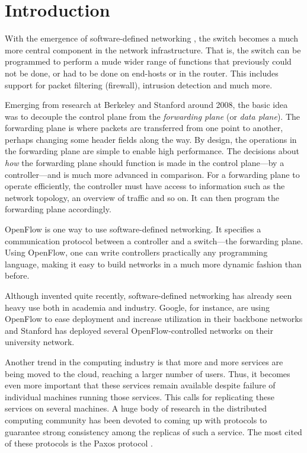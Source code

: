 \chapter{Introduction}

With the emergence of software-defined networking
\cite{Casado:2005:VNS:1047344.1047383}, the switch becomes a much
more central component in the network infrastructure.
%
That is, the switch can be programmed to perform a mude wider range of
functions that previously could not be done, or had to be done on end-hosts
or in the router.
%
This includes support for packet filtering (firewall), intrusion detection
and much more.

Emerging from research at Berkeley and
Stanford around 2008, the basic idea was to decouple the
control plane from the \textit{forwarding plane} (or
\textit{data plane}).
%
The forwarding plane is where packets are transferred from one point to
another, perhaps changing some header fields along the way.
%
By design, the operations in the forwarding plane are simple to enable high
performance.
%
The decisions about \textit{how} the forwarding plane should function is
made in the control plane---by a controller---and is much more advanced in
comparison.
%
For a forwarding plane to operate efficiently, the controller must have
access to information such as the network topology, an overview of traffic
and so on.  It can then program the forwarding plane accordingly.

OpenFlow \cite{openflow-1.0} is one way to use software-defined
networking.  It specifies a communication protocol between a controller and
a switch---the forwarding plane.
Using OpenFlow, one can write controllers practically any programming
language, making it easy to build networks in a much more dynamic fashion
than before.

Although invented quite recently, software-defined networking has already
seen heavy use both in academia and industry.
%
Google, for instance, are
using OpenFlow to ease deployment and increase utilization in their backbone
networks \cite{crabbe2012sdn} and Stanford has deployed several
OpenFlow-controlled networks on their university network.

Another trend in the computing industry is that more and more services are
being moved to the cloud, reaching a larger number of users.
%
Thus, it becomes even more important that these services remain available
despite failure of individual machines running those services.
%
This calls for replicating these services on several machines.
%
A huge body of research in the distributed computing community has been
devoted to coming up with protocols to guarantee strong consistency among
the replicas of such a service.
%
The most cited of these protocols is the Paxos protocol
\cite{Lam01,Lamport:1998:PP:279227.279229}.

